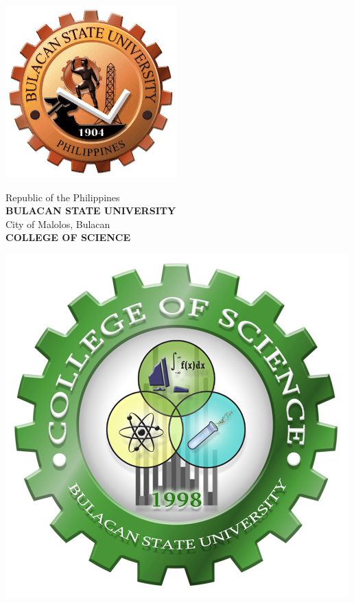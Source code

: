 \documentclass[11pt]{article}
\author{Leinnarf}
\begin{document}

\onehalfspacing

\begin{titlepage}
    \begin{center}

        \begin{center}
            \begin{minipage}{0.2\textwidth}
                \includegraphics[width=.8\textwidth]{bulsu_logo.png}
            \end{minipage}
            \begin{minipage}{0.5\textwidth}
                \centering
                \singlespacing
                \fontsize{10}{9}
                Republic of the Philippines\\
                \textbf{BULACAN STATE UNIVERSITY}\\
                City of Malolos, Bulacan\\
                \textbf{COLLEGE OF SCIENCE}\\
            \end{minipage}
            \begin{minipage}{0.2\textwidth}
                \includegraphics[width=.8\textwidth]{cs_logo.png} 

\end{minipage}
\end{center}
\end{center}
\end{titlepage}
\end{document}
